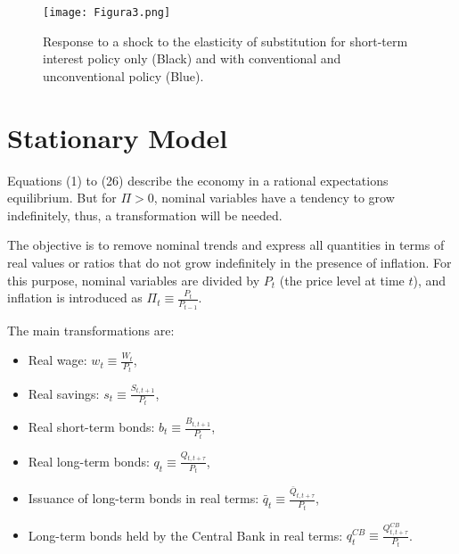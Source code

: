 \documentclass[12pt]{article}
\begin{document}
\begin{figure}[H]
    \centering
    \texttt{[image: Figura3.png]}
    \caption{Response to a shock to the elasticity of substitution for short-term interest policy only (Black) and with conventional and unconventional policy
(Blue).}
    \label{fig:enter-label}
\end{figure}
































\appendix



\section{Stationary Model}

Equations (1) to (26) describe the economy in a rational expectations equilibrium. But for $\Pi > 0$, nominal variables have a tendency to grow indefinitely, thus, a transformation will be needed.

The objective is to remove nominal trends and express all quantities in terms of real values or ratios that do not grow indefinitely in the presence of inflation. For this purpose, nominal variables are divided by \(P_t\) (the price level at time \(t\)), and inflation is introduced as \(\Pi_t \equiv \frac{P_t}{P_{t-1}}\).

The main transformations are:

\begin{itemize}
    \item Real wage: \(w_t \equiv \frac{W_t}{P_t}\),
    \item Real savings: \(s_t \equiv \frac{S_{t,t+1}}{P_t}\),
    \item Real short-term bonds: \(b_t \equiv \frac{B_{t,t+1}}{P_t}\),
    \item Real long-term bonds: \(q_t \equiv \frac{Q_{t,t+\tau}}{P_t}\),
    \item Issuance of long-term bonds in real terms: \(\bar{q}_t \equiv \frac{\bar{Q}_{t,t+\tau}}{P_t}\),
    \item Long-term bonds held by the Central Bank in real terms: \(q_t^{CB} \equiv \frac{Q_{t,t+\tau}^{CB}}{P_t}\).
\end{itemize}
\end{document}
